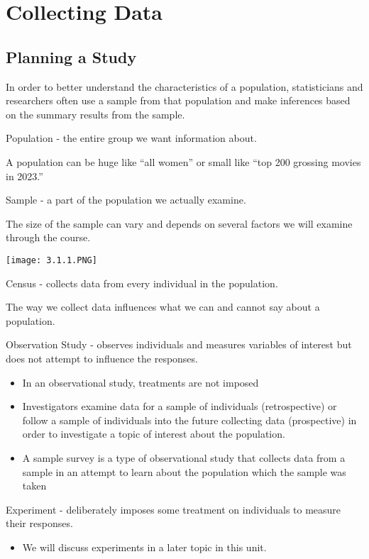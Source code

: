 \documentclass[../stats.tex]{subfiles}
\begin{document}
\chapter{Collecting Data}
\section{Planning a Study}
In order to better understand the characteristics of a population, statisticians and researchers often use a sample from that population and make inferences based on the summary results from the sample.

Population - the entire group we want information about. 

A population can be huge like ``all women'' or small like ``top 200 grossing movies in 2023.''

Sample - a part of the population we actually examine.

The size of the sample can vary and depends on several factors we will examine through the course.
\begin{center}
    \texttt{[image: 3.1.1.PNG]}
\end{center}

Census - collects data from every individual in the population.

The way we collect data influences what we can and cannot say about a population.

Observation Study - observes individuals and measures variables of interest but does not attempt to influence the responses.
\begin{itemize}
    \item In an observational study, treatments are not imposed 
    \item Investigators examine data for a sample of individuals (retrospective) or follow a sample of individuals into the future collecting data (prospective) in order to investigate a topic of interest about the population.
    \item A sample survey is a type of observational study that collects data from a sample in an attempt to learn about the population which the sample was taken
\end{itemize}

Experiment - deliberately imposes some treatment on individuals to measure their responses.
\begin{itemize}
    \item We will discuss experiments in a later topic in this unit.
\end{itemize}
\end{document}
